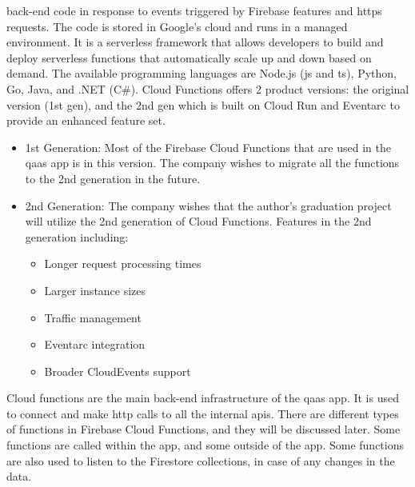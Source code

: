 \begin{multicols}{2}
\begin{itemize}
                  back-end code in response to events triggered by Firebase features and \acrshort{https} requests.
                  The code is stored in Google's cloud and runs in a managed environment. It is a serverless framework
                  that allows developers to build and deploy serverless functions that automatically scale up and down
                  based on demand. The available programming languages are Node.js (\acrshort{js} and \acrshort{ts}),
                  Python, Go, Java, and .NET (C\#). Cloud Functions offers 2 product versions: the original version
                  (1st gen), and the 2nd gen which is built on Cloud Run and Eventarc to provide an enhanced feature set.
                  \begin{itemize}
                        \item 1st Generation: Most of the Firebase Cloud Functions that are used in the \acrshort{qaas} app
                              is in this version. The company wishes to migrate all the functions to the 2nd generation in
                              the future.
                        \item 2nd Generation: The company wishes that the author's graduation project will utilize the 2nd
                              generation of Cloud Functions. Features in the 2nd generation including:
                              \begin{itemize}
                                    \item Longer request processing times
                                    \item Larger instance sizes
                                    \item Traffic management
                                    \item Eventarc integration
                                    \item Broader CloudEvents support
                              \end{itemize}
                  \end{itemize}
                  Cloud functions are the main back-end infrastructure of the \acrshort{qaas} app. It is used to connect
                  and make \acrshort{http} calls to all the internal \acrshort{api}s. There are different types of
                  functions in Firebase Cloud Functions, and they will be discussed later. Some functions are called within
                  the app, and some outside of the app. Some functions are also used to listen to the Firestore collections,
                  in case of any changes in the data.
      \end{itemize}
\end{multicols}

